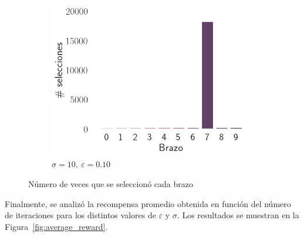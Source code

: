 \documentclass[12pt]{article}
\begin{document}
\begin{figure}[H]
\begin{subfigure}[H]{0.3\textwidth}
            \includegraphics[width=\textwidth]{../img/arm_sigma_10_epsilon_0.1}
            \caption{$\sigma=10 ,\ \varepsilon=0.10$}
            \label{fig:arms_selected_10_0.1}
        \end{subfigure}

        \caption{Número de veces que se seleccionó cada brazo}
        \label{fig:arms_selected}
    \end{figure}

    Finalmente, se analizó la recompensa promedio obtenida en función del número de iteraciones para los distintos valores de $\varepsilon$ y $\sigma$.
    Los resultados se muestran en la Figura~\ref{fig:average_reward}.
\end{document}
